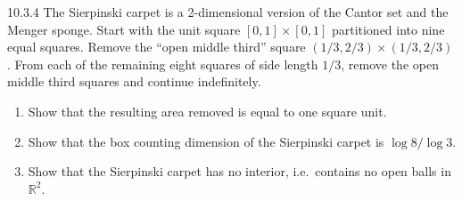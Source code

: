 \begin{problem}{10.3.4}
  The Sierpinski carpet is a 2-dimensional version of the Cantor set and the Menger sponge.
  Start with the unit square $[0, 1] \times [0,1]$ partitioned into nine equal squares.
  Remove the ``open middle third'' square $(1/3, 2/3) \times (1/3, 2/3)$.
  From each of the remaining eight squares of side length $1/3$, remove the open middle third squares and continue indefinitely.
  \begin{enumerate}
    \item Show that the resulting area removed is equal to one square unit.
    \item Show that the box counting dimension of the Sierpinski carpet is $\log 8 / \log 3$.
    \item Show that the Sierpinski carpet has no interior, i.e.\ contains no open balls in $\mathbb{R}^2$.
  \end{enumerate}
\end{problem}

